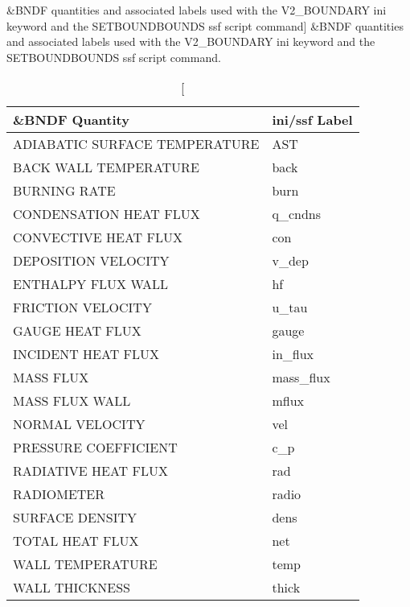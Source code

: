 \begin{table}[bph]
\begin{center}
\caption
[\&BNDF quantities and associated labels used with the V2\_BOUNDARY ini keyword and the SETBOUNDBOUNDS ssf script command]
{\&BNDF quantities and associated labels used with the V2\_BOUNDARY ini keyword and the SETBOUNDBOUNDS ssf script command.}
\vspace{0.1in}
\begin{tabular}{|l|l|}
\hline
\&BNDF Quantity & ini/ssf Label \\ \hline
 ADIABATIC SURFACE TEMPERATURE  &   AST \\ \hline
 BACK WALL TEMPERATURE  &   back \\ \hline
 BURNING RATE  &   burn \\ \hline
 CONDENSATION HEAT FLUX  &   q\_cndns \\ \hline
 CONVECTIVE HEAT FLUX  &   con \\ \hline
 DEPOSITION VELOCITY  &   v\_dep \\ \hline
 ENTHALPY FLUX WALL  &   hf \\ \hline
 FRICTION VELOCITY  &   u\_tau \\ \hline
 GAUGE HEAT FLUX  &   gauge \\ \hline
 INCIDENT HEAT FLUX  &   in\_flux \\ \hline
 MASS FLUX  &   mass\_flux \\ \hline
 MASS FLUX WALL  &   mflux \\ \hline
 NORMAL VELOCITY  &   vel \\ \hline
 PRESSURE COEFFICIENT  &   c\_p \\ \hline
 RADIATIVE HEAT FLUX  &   rad \\ \hline
 RADIOMETER  &   radio \\ \hline
 SURFACE DENSITY  &   dens \\ \hline
 TOTAL HEAT FLUX  &   net \\ \hline
 WALL TEMPERATURE  &   temp \\ \hline
 WALL THICKNESS  &   thick \\ \hline
\end{tabular}
\label{tabBNDF}
\end{center}
\end{table}
